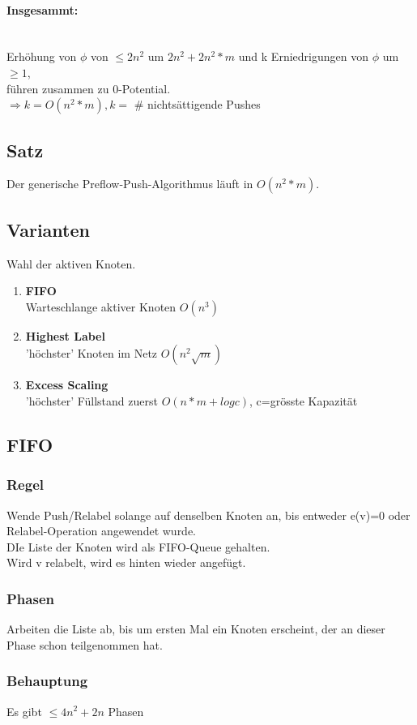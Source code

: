 \documentclass[11pt]{article}
\newcommand{\pns}{nichts\"attigende Pushes\ }
\begin{document}
\paragraph{Insgesammt:} \ \\
Erh\"ohung von $\phi$ von $\leq 2n^2$ um $2n^2 + 2n^2*m$ und k Erniedrigungen von $\phi$ um $\geq 1$,\\
f\"uhren zusammen zu 0-Potential. \\
$\Rightarrow k = O(n^2*m), k =$ \# \pns

\subsection{Satz}
Der generische Preflow-Push-Algorithmus l\"auft in $O(n^2*m)$.
\subsection{Varianten} Wahl der aktiven Knoten.
\begin{enumerate}
    \item \textbf{FIFO} \\
        Warteschlange aktiver Knoten $O(n^3)$
    \item \textbf{Highest Label} \\
        'h\"ochster' Knoten im Netz $O(n^2\sqrt{m})$
    \item \textbf{Excess Scaling} \\
        'h\"ochster' F\"ullstand zuerst $O(n*m + log c)$, c=gr\"osste Kapazit\"at
\end{enumerate}
\subsection{FIFO}
\subsubsection{Regel}
Wende Push/Relabel solange auf denselben Knoten an, bis entweder e(v)=0 oder Relabel-Operation angewendet wurde.\\
DIe Liste der Knoten wird als FIFO-Queue gehalten.\\
Wird v relabelt, wird es hinten wieder angef\"ugt.
\subsubsection{Phasen}
Arbeiten die Liste ab, bis um ersten Mal ein Knoten erscheint, der an dieser Phase schon teilgenommen hat.
\subsubsection{Behauptung}
Es gibt $\leq 4n^2 + 2n$ Phasen
\end{document}
